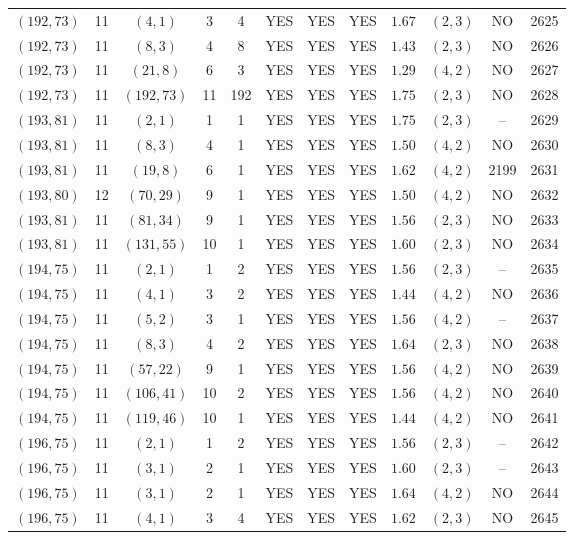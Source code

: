 \begin{longtable}{|c|c|c|c|c|c|c|c|c|c|c|c|}
$(192,73)$ & 11 & $(4,1)$ & 3 & 4 & YES & YES & YES & $1.67$ & $(2,3)$ & NO & 2625\\
$(192,73)$ & 11 & $(8,3)$ & 4 & 8 & YES & YES & YES & $1.43$ & $(2,3)$ & NO & 2626\\
$(192,73)$ & 11 & $(21,8)$ & 6 & 3 & YES & YES & YES & $1.29$ & $(4,2)$ & NO & 2627\\
$(192,73)$ & 11 & $(192,73)$ & 11 & 192 & YES & YES & YES & $1.75$ & $(2,3)$ & NO & 2628\\
$(193,81)$ & 11 & $(2,1)$ & 1 & 1 & YES & YES & YES & $1.75$ & $(2,3)$ & -- & 2629\\
$(193,81)$ & 11 & $(8,3)$ & 4 & 1 & YES & YES & YES & $1.50$ & $(4,2)$ & NO & 2630\\
$(193,81)$ & 11 & $(19,8)$ & 6 & 1 & YES & YES & YES & $1.62$ & $(4,2)$ & 2199 & 2631\\
$(193,80)$ & 12 & $(70,29)$ & 9 & 1 & YES & YES & YES & $1.50$ & $(4,2)$ & NO & 2632\\
$(193,81)$ & 11 & $(81,34)$ & 9 & 1 & YES & YES & YES & $1.56$ & $(2,3)$ & NO & 2633\\
$(193,81)$ & 11 & $(131,55)$ & 10 & 1 & YES & YES & YES & $1.60$ & $(2,3)$ & NO & 2634\\
$(194,75)$ & 11 & $(2,1)$ & 1 & 2 & YES & YES & YES & $1.56$ & $(2,3)$ & -- & 2635\\
$(194,75)$ & 11 & $(4,1)$ & 3 & 2 & YES & YES & YES & $1.44$ & $(4,2)$ & NO & 2636\\
$(194,75)$ & 11 & $(5,2)$ & 3 & 1 & YES & YES & YES & $1.56$ & $(4,2)$ & -- & 2637\\
$(194,75)$ & 11 & $(8,3)$ & 4 & 2 & YES & YES & YES & $1.64$ & $(2,3)$ & NO & 2638\\
$(194,75)$ & 11 & $(57,22)$ & 9 & 1 & YES & YES & YES & $1.56$ & $(4,2)$ & NO & 2639\\
$(194,75)$ & 11 & $(106,41)$ & 10 & 2 & YES & YES & YES & $1.56$ & $(4,2)$ & NO & 2640\\
$(194,75)$ & 11 & $(119,46)$ & 10 & 1 & YES & YES & YES & $1.44$ & $(4,2)$ & NO & 2641\\
$(196,75)$ & 11 & $(2,1)$ & 1 & 2 & YES & YES & YES & $1.56$ & $(2,3)$ & -- & 2642\\
$(196,75)$ & 11 & $(3,1)$ & 2 & 1 & YES & YES & YES & $1.60$ & $(2,3)$ & -- & 2643\\
$(196,75)$ & 11 & $(3,1)$ & 2 & 1 & YES & YES & YES & $1.64$ & $(4,2)$ & NO & 2644\\
$(196,75)$ & 11 & $(4,1)$ & 3 & 4 & YES & YES & YES & $1.62$ & $(2,3)$ & NO & 2645\\

\end{longtable}
